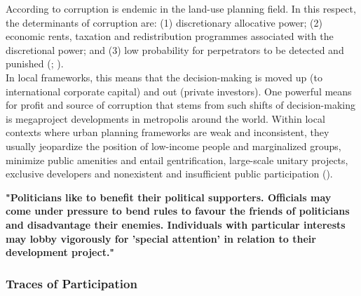 \documentclass[11pt]{report}
\begin{document}
According to
\href{Chiodelli}{\cite{chiodelli_corruption_2015}} corruption is endemic in the land-use planning field.
In this respect, the determinants of corruption are:
(1) discretionary allocative power; (2) economic rents, taxation and redistribution programmes associated with the discretional power; and (3) low probability for perpetrators to be detected and punished
(\href{Healey}{\citealt{healey_collaborative_1997}}; 
\href{Chiodelli}{\citealt{chiodelli_corruption_2015}}).
\\

In local frameworks, this means that the decision-making is moved up (to international corporate capital) and out (private investors).
One powerful means for profit and source of corruption that stems from such shifts of decision-making is megaproject developments in metropolis around the world.
Within local contexts where urban planning frameworks are weak and inconsistent, they usually jeopardize the position of low-income people and marginalized groups, minimize public amenities and entail gentrification, large-scale unitary projects, exclusive developers and nonexistent and insufficient public participation (\href{Farnstein}{\citealt{Farnstein_Just_2010}}).

\textbf{"Politicians like to benefit their political supporters. Officials may come under pressure to bend rules to favour the friends of politicians and disadvantage their enemies. Individuals with particular interests may lobby vigorously for 'special attention' in relation to their development project." \href{Healey}{\citealt{healey_collaborative_1997}}}

\subsubsection{Traces of Participation}
\end{document}
